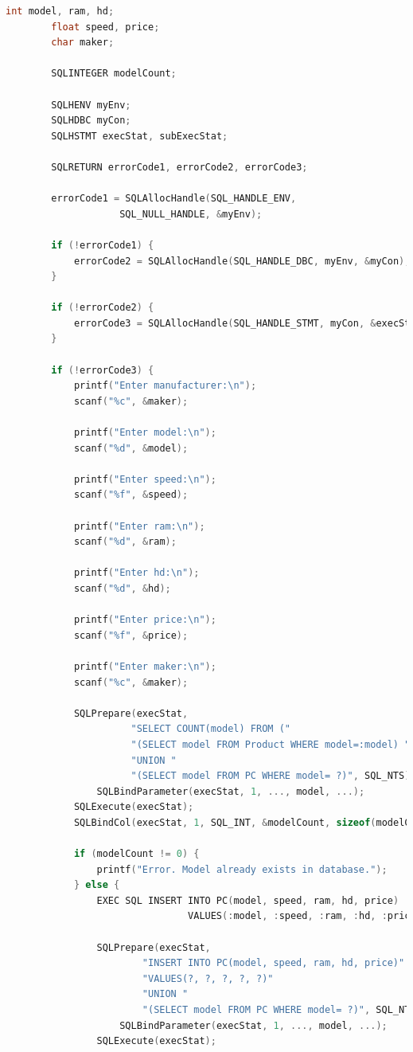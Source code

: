 \documentclass[12pt]{article}
\begin{document}
\begin{enumerate}[1.]
\begin{enumerate}[a)]
\begin{lstlisting}[language=c]
        int model, ram, hd;
        float speed, price;
        char maker;

        SQLINTEGER modelCount;

        SQLHENV myEnv;
        SQLHDBC myCon;
        SQLHSTMT execStat, subExecStat;

        SQLRETURN errorCode1, errorCode2, errorCode3;

        errorCode1 = SQLAllocHandle(SQL_HANDLE_ENV,
                    SQL_NULL_HANDLE, &myEnv);

        if (!errorCode1) {
            errorCode2 = SQLAllocHandle(SQL_HANDLE_DBC, myEnv, &myCon);
        }

        if (!errorCode2) {
            errorCode3 = SQLAllocHandle(SQL_HANDLE_STMT, myCon, &execStat);
        }

        if (!errorCode3) {
            printf("Enter manufacturer:\n");
            scanf("%c", &maker);

            printf("Enter model:\n");
            scanf("%d", &model);

            printf("Enter speed:\n");
            scanf("%f", &speed);

            printf("Enter ram:\n");
            scanf("%d", &ram);

            printf("Enter hd:\n");
            scanf("%d", &hd);

            printf("Enter price:\n");
            scanf("%f", &price);

            printf("Enter maker:\n");
            scanf("%c", &maker);

            SQLPrepare(execStat,
                      "SELECT COUNT(model) FROM ("
                      "(SELECT model FROM Product WHERE model=:model) "
                      "UNION "
                      "(SELECT model FROM PC WHERE model= ?)", SQL_NTS);
                SQLBindParameter(execStat, 1, ..., model, ...);
            SQLExecute(execStat);
            SQLBindCol(execStat, 1, SQL_INT, &modelCount, sizeof(modelCount), &modelCountInfo);

            if (modelCount != 0) {
                printf("Error. Model already exists in database.");
            } else {
                EXEC SQL INSERT INTO PC(model, speed, ram, hd, price)
                                VALUES(:model, :speed, :ram, :hd, :price);

                SQLPrepare(execStat,
                        "INSERT INTO PC(model, speed, ram, hd, price)"
                        "VALUES(?, ?, ?, ?, ?)"
                        "UNION "
                        "(SELECT model FROM PC WHERE model= ?)", SQL_NTS);
                    SQLBindParameter(execStat, 1, ..., model, ...);
                SQLExecute(execStat);


\end{lstlisting}
\end{enumerate}
\end{enumerate}
\end{document}
